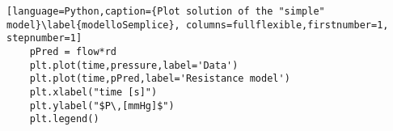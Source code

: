 \begin{lstlisting}[language=Python,caption={Plot solution of the "simple" model}\label{modelloSemplice}, columns=fullflexible,firstnumber=1, stepnumber=1]
    pPred = flow*rd
    plt.plot(time,pressure,label='Data')
    plt.plot(time,pPred,label='Resistance model')
    plt.xlabel("time [s]")
    plt.ylabel("$P\,[mmHg]$")
    plt.legend()
\end{lstlisting}